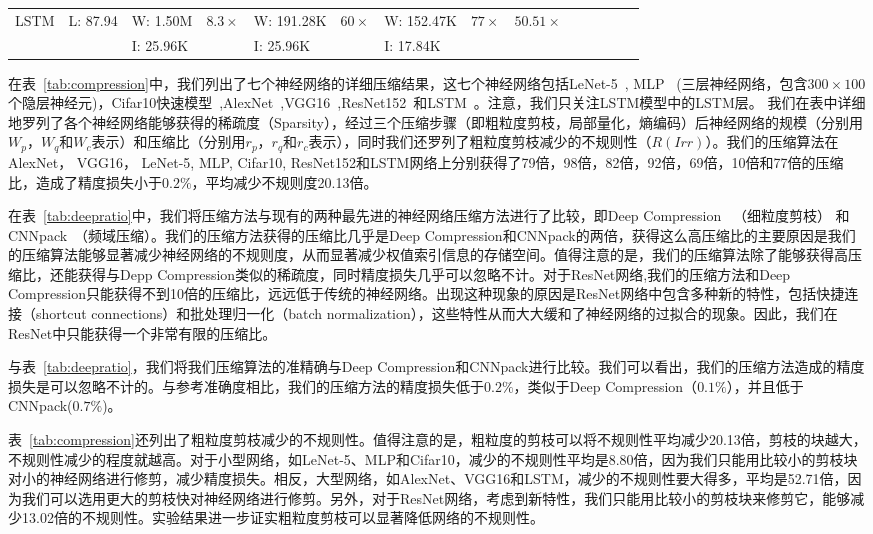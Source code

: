 \begin{table}[h]
\begin{tabular}{@{}l@{~}l@{\!\!}l@{~}l@{\,}l@{~}l@{\,}l@{}l@{~}l@{~}l@{~}l@{~}lll}
LSTM 		& L: 87.94  		&W: 1.50M 	&$8.3\times$  &W: 191.28K 	& $60\times$	& W: 152.47K 	& $77\times$	& $50.51\times$							\\
  			&   				&I: 25.96K   & 			 &I: 25.96K 		&			& I: 17.84K	  	& 				&		\\
\bottomrule
\end{tabular}
\end{table}

在表~\ref{tab:compression}中，我们列出了七个神经网络的详细压缩结果，这七个神经网络包括LeNet-5~\cite{lecun1998gradient}, MLP~\cite{Srivastava2014} (三层神经网络，包含$300\times 100$个隐层神经元)，Cifar10快速模型~\cite{krizhevsky2012cuda},AlexNet~\cite{krizhevsky2012imagenet},VGG16~\cite{simonyan2014very},ResNet152~\cite{he2016deep}和LSTM~\cite{sak2014long}。注意，我们只关注LSTM模型中的LSTM层。
我们在表中详细地罗列了各个神经网络能够获得的稀疏度（Sparsity），经过三个压缩步骤（即粗粒度剪枝，局部量化，熵编码）后神经网络的规模（分别用$W_p$，$W_q$和$W_c$表示）和压缩比（分别用$r_p$，$r_q$和$r_c$表示），同时我们还罗列了粗粒度剪枝减少的不规则性（$R(Irr)$）。我们的压缩算法在AlexNet， VGG16， LeNet-5, MLP, Cifar10, ResNet152和LSTM网络上分别获得了79倍，98倍，82倍，92倍，69倍，10倍和77倍的压缩比，造成了精度损失小于$0.2\%$，平均减少不规则度20.13倍。

在表~\ref{tab:deepratio}中，我们将压缩方法与现有的两种最先进的神经网络压缩方法进行了比较，即Deep Compression~\cite{han2015deep} （细粒度剪枝） 和CNNpack~\cite{wang2016cnnpack}（频域压缩）。我们的压缩方法获得的压缩比几乎是Deep Compression和CNNpack的两倍，获得这么高压缩比的主要原因是我们的压缩算法能够显著减少神经网络的不规则度，从而显著减少权值索引信息的存储空间。值得注意的是，我们的压缩算法除了能够获得高压缩比，还能获得与Depp Compression类似的稀疏度，同时精度损失几乎可以忽略不计。对于ResNet网络,我们的压缩方法和Deep Compression只能获得不到10倍的压缩比，远远低于传统的神经网络。出现这种现象的原因是ResNet网络中包含多种新的特性，包括快捷连接（shortcut connections）和批处理归一化（batch normalization），这些特性从而大大缓和了神经网络的过拟合的现象。因此，我们在ResNet中只能获得一个非常有限的压缩比。

与表~\ref{tab:deepratio}，我们将我们压缩算法的准精确与Deep Compression和CNNpack进行比较。我们可以看出，我们的压缩方法造成的精度损失是可以忽略不计的。与参考准确度相比，我们的压缩方法的精度损失低于$0.2\%$，类似于Deep Compression（$0.1\%$），并且低于CNNpack($0.7\%$)。

表~\ref{tab:compression}还列出了粗粒度剪枝减少的不规则性。值得注意的是，粗粒度的剪枝可以将不规则性平均减少20.13倍，剪枝的块越大，不规则性减少的程度就越高。对于小型网络，如LeNet-5、MLP和Cifar10，减少的不规则性平均是8.80倍，因为我们只能用比较小的剪枝块对小的神经网络进行修剪，减少精度损失。相反，大型网络，如AlexNet、VGG16和LSTM，减少的不规则性要大得多，平均是52.71倍，因为我们可以选用更大的剪枝快对神经网络进行修剪。另外，对于ResNet网络，考虑到新特性，我们只能用比较小的剪枝块来修剪它，能够减少13.02倍的不规则性。实验结果进一步证实粗粒度剪枝可以显著降低网络的不规则性。

